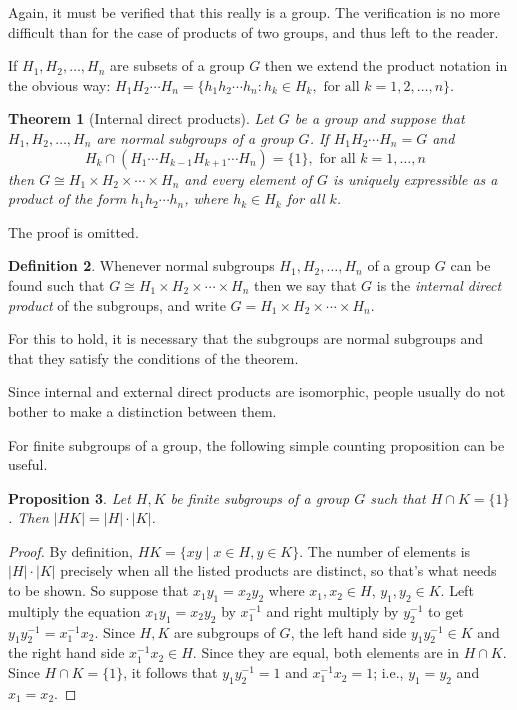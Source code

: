 \documentclass[11pt,oneside]{article}
\newtheorem{thm}{Theorem}[section]
\newtheorem{prop}[thm]{Proposition}
\theoremstyle{definition}
\newtheorem{defn}[thm]{Definition}
\begin{document}
Again, it must be verified that this really is a group. The
verification is no more difficult than for the case of products of two
groups, and thus left to the reader. 


If $H_1, H_2, \dots, H_n$ are subsets of a group $G$ then we extend
the product notation in the obvious way: $H_1H_2 \cdots H_n = \{
h_1h_2 \cdots h_n: h_k \in H_k, \text{ for all } k = 1, 2, \dots, n
\}$.



\begin{thm}[Internal direct products]
Let $G$ be a group and suppose that $H_1, H_2, \dots, H_n$ are normal
subgroups of a group $G$. If $H_1H_2 \cdots H_n = G$ and
\[
  H_k \cap (H_1 \cdots H_{k-1} H_{k+1} \cdots H_n) = \{1\}, \text{ for
    all $k = 1, \dots, n$ }
\] 
then $G \cong H_1 \times H_2 \times \cdots \times H_n$ and every
element of $G$ is uniquely expressible as a product of the form $h_1
h_2 \cdots h_n$, where $h_k \in H_k$ for all $k$.
\end{thm}

The proof is omitted.  

\begin{defn}
  Whenever normal subgroups $H_1, H_2, \dots, H_n$ of a group $G$ can
  be found such that $G \cong H_1 \times H_2 \times \cdots \times H_n$
  then we say that $G$ is the \emph{internal direct product} of the
  subgroups, and write $G = H_1 \times H_2 \times \cdots \times H_n$.
\end{defn}

For this to hold, it is necessary that the subgroups are normal
subgroups and that they satisfy the conditions of the theorem.

Since internal and external direct products are isomorphic, people
usually do not bother to make a distinction between them.

For finite subgroups of a group, the following simple counting
proposition can be useful. 

\begin{prop}\label{prop:counting-HK}
  Let $H,K$ be finite subgroups of a group $G$ such that $H \cap K =
  \{1\}$.  Then $|HK| = |H| \cdot |K|$.
\end{prop}

\begin{proof}
By definition, $HK = \{xy \mid x \in H, y \in K\}$. The number of
elements is $|H| \cdot |K|$ precisely when all the listed products are
distinct, so that's what needs to be shown. So suppose that $x_1y_1 =
x_2 y_2$ where $x_1,x_2 \in H$, $y_1, y_2 \in K$. Left multiply the
equation $x_1y_1 = x_2 y_2$ by $x_1^{-1}$ and right multiply by
$y_2^{-1}$ to get $y_1y_2^{-1} = x_1^{-1}x_2$. Since $H,K$ are
subgroups of $G$, the left hand side $y_1y_2^{-1} \in K$ and the right
hand side $x_1^{-1}x_2 \in H$. Since they are equal, both elements are
in $H \cap K$. Since $H \cap K = \{1\}$, it follows that $y_1y_2^{-1}
= 1$ and $x_1^{-1}x_2 =1$; i.e., $y_1 = y_2$ and $x_1 = x_2$.
\end{proof}
\end{document}
